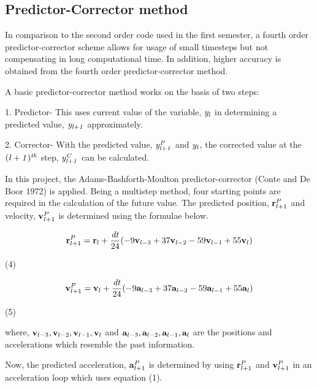\documentclass{article}
\begin{document}
\subsection{Predictor-Corrector method}
{\normalsize{
In comparison to the second order code used in the first semester, a fourth order predictor-corrector scheme allows for usage of small timesteps but not compensating in long computational time. In addition, higher accuracy is obtained from the fourth order predictor-corrector method.

A basic predictor-corrector method works on the basis of two steps:

\medskip

1. Predictor- This uses current value of the variable, ${\it y_l}$ in determining a predicted value, ${\it y_{l+1}}$ approximately.

\smallskip

2. Corrector- With the predicted value, ${\it y_{l+1}^P}$ and ${\it y_l}$, the corrected value at the ${\it (l+1)^{th}}$ step, ${\it y_{l+1}^C}$ can be calculated.

\medskip

In this project, the Adams-Bashforth-Moulton predictor-corrector (Conte and De Boor 1972) is applied. Being a multistep method, four starting points are required in the calculation of the future value. The predicted position, ${{\bf r}_{l+1}^P}$ and velocity, ${{\bf v}_{l+1}^P}$ is determined using the formulae below.

\[ {\bf r}_{l+1}^P = {\bf r}_l + \frac{{\it dt}} {24} (-9{\bf v}_{l-3} + 37{\bf v}_{l-2} - 59{\bf v}_{l-1} + 55{\bf v}_l) \]
\begin{flushright} (4) \end{flushright}

\[ {\bf v}_{l+1}^P = {\bf v}_l + \frac{{\it dt}} {24} (-9{\bf a}_{l-3} + 37{\bf a}_{l-2} - 59{\bf a}_{l-1} + 55{\bf a}_l) \]
\begin{flushright} (5) \end{flushright}

\smallskip

where,
\smallskip
${\bf v}_{l-3}, {\bf v}_{l-2}, {\bf v}_{l-1}, {\bf v}_l$ and ${\bf a}_{l-3}, {\bf a}_{l-2}, {\bf a}_{l-1}, {\bf a}_l$ are the positions and accelerations which resemble the past information.
\smallskip

Now, the predicted acceleration, ${\bf a}_{l+1}^P$ is determined by using ${\bf r}_{l+1}^P$ and ${\bf v}_{l+1}^P$ in an acceleration loop which uses equation (1). 
\medskip

}}
\end{document}
